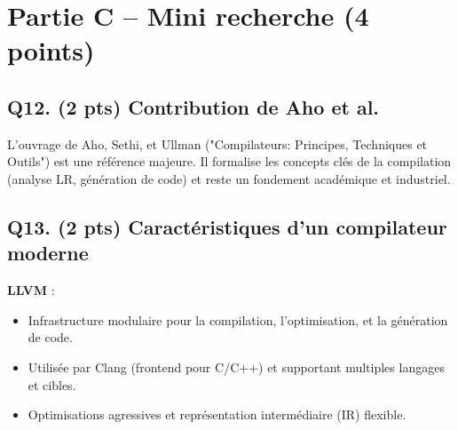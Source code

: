 \documentclass[12pt]{article}
\begin{document}
\section*{Partie C – Mini recherche (4 points)}

\subsection*{Q12. (2 pts) Contribution de Aho et al.}
L'ouvrage de Aho, Sethi, et Ullman ("Compilateurs: Principes, Techniques et Outils") est une référence majeure. Il formalise les concepts clés de la compilation (analyse LR, génération de code) et reste un fondement académique et industriel.

\subsection*{Q13. (2 pts) Caractéristiques d'un compilateur moderne}
\textbf{LLVM} :
\begin{itemize}
    \item Infrastructure modulaire pour la compilation, l'optimisation, et la génération de code.
    \item Utilisée par Clang (frontend pour C/C++) et supportant multiples langages et cibles.
    \item Optimisations agressives et représentation intermédiaire (IR) flexible.
\end{itemize}
\end{document}
